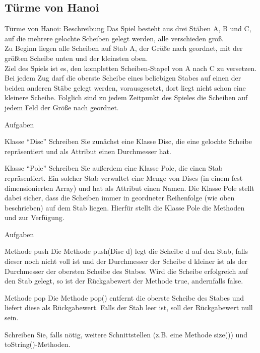 \documentclass[usepdftitle=false,hyperref={pdfpagelabels=false}]{beamer}
\begin{document}
\subsection{Türme von Hanoi}
\begin{frame}{Türme von Hanoi: Beschreibung}
    Das Spiel besteht aus drei Stäben A, B und C, auf die mehrere gelochte Scheiben gelegt werden,
    alle verschieden groß.\\
    Zu Beginn liegen alle Scheiben auf Stab A, der Größe nach geordnet, mit der
    größten Scheibe unten und der kleinsten oben.\\
    Ziel des Spiels ist es, den kompletten Scheiben-Stapel
    von A nach C zu versetzen.\\
    Bei jedem Zug darf die oberste Scheibe eines beliebigen Stabes auf einen
    der beiden anderen Stäbe gelegt werden, vorausgesetzt, dort liegt nicht schon eine kleinere Scheibe.
    Folglich sind zu jedem Zeitpunkt des Spieles die Scheiben auf jedem Feld der Größe nach geordnet.
\end{frame}

\begin{frame}{Aufgaben}
    \begin{block}{Klasse "`Disc"'}
        Schreiben Sie zunächst eine Klasse Disc, die eine gelochte 
        Scheibe repräsentiert und als Attribut einen Durchmesser hat.
    \end{block}

    \begin{block}{Klasse "`Pole"'}
        Schreiben Sie außerdem eine Klasse Pole, die einen Stab repräsentiert. Ein solcher Stab verwaltet eine
        Menge von Discs (in einem fest dimensionierten Array) und hat als Attribut einen Namen. Die Klasse
        Pole stellt dabei sicher, dass die Scheiben immer in geordneter Reihenfolge (wie oben beschrieben)
        auf dem Stab liegen. Hierfür stellt die Klasse Pole die Methoden
         und
         zur Verfügung.
    \end{block}
\end{frame}

\begin{frame}{Aufgaben}
    \begin{block}{Methode push}
        Die Methode push(Disc d) legt die Scheibe d auf den Stab, 
        falls dieser noch nicht voll ist und
        der Durchmesser der Scheibe d kleiner ist als der Durchmesser 
        der obersten Scheibe des Stabes. Wird
        die Scheibe erfolgreich auf den Stab gelegt, so ist der 
        Rückgabewert der Methode true, andernfalls
        false.
    \end{block}

    \begin{block}{Methode pop}
        Die Methode pop() entfernt die oberste Scheibe des Stabes und 
        liefert diese als Rückgabewert. Falls
        der Stab leer ist, soll der Rückgabewert null sein.
    \end{block}

    Schreiben Sie, falls nötig, weitere Schnittstellen 
    (z.B. eine Methode size()) und toString()-Methoden.
\end{frame}
\end{document}
